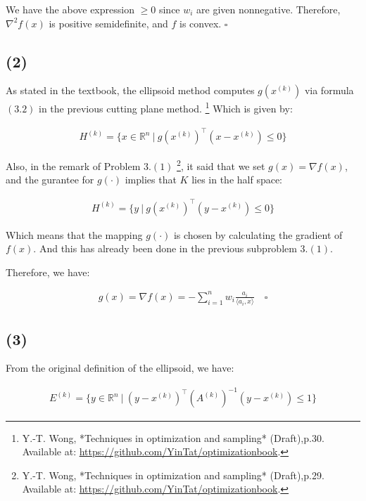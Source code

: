 \documentclass{article}
\begin{document}
We have the above expression $\ge 0$ since $w_i$ are given nonnegative.
Therefore, $\nabla^2 f(x)$ is positive semidefinite,
and $f$ is convex. $\square$

\subsection*{(2)}

As stated in the textbook, 
the ellipsoid method computes $g(x^{(k)})$ via formula $(3.2)$ in the previous cutting plane method.
\footnote{Y.-T. Wong, *Techniques in optimization and sampling* (Draft),p.30. Available at: \url{https://github.com/YinTat/optimizationbook}.}
Which is given by:

\begin{align*}
    H^{(k)} = \{x \in \mathbb{R}^n \ | \ g(x^{(k)})^\intercal (x - x^{(k)}) \le 0\}
\end{align*}

Also, in the remark of Problem $3. (1)$
\footnote{Y.-T. Wong, *Techniques in optimization and sampling* (Draft),p.29. Available at: \url{https://github.com/YinTat/optimizationbook}.}, 
it said that we set $g(x) = \nabla f(x)$, 
and the gurantee for $g(\cdot)$ implies that $K$ lies in the half space:

\begin{align*}
    H^{(k)} = \{y \ | \ g(x^{(k)})^\intercal (y - x^{(k)}) \le 0\}
\end{align*}

Which means that the mapping $g(\cdot)$ is chosen by calculating the gradient of $f(x)$.
And this has already been done in the previous subproblem $3. (1)$.
\bigskip

Therefore, we have:

\begin{align*}
    g(x) = \nabla f(x) = -\sum_{i=1}^{n} w_i \frac{a_i}{\langle a_i, x \rangle} \quad \square
\end{align*}

\subsection*{(3)}

From the original definition of the ellipsoid, we have:

\begin{align*}
    E^{(k)} = \{ y \in \mathbb{R}^n \ | \ (y - x^{(k)})^\intercal (A^{(k)})^{-1} (y - x^{(k)}) \le 1 \} \tag{1}
\end{align*}
\end{document}
